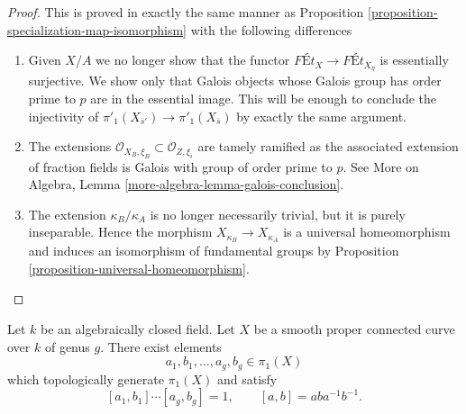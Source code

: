 \begin{proof}
This is proved in exactly the same manner as
Proposition \ref{proposition-specialization-map-isomorphism}
with the following differences
\begin{enumerate}
\item Given $X/A$ we no longer show that the functor
$\textit{F\'Et}_X \to \textit{F\'Et}_{X_{\overline{\eta}}}$
is essentially surjective. We show only that Galois objects
whose Galois group has order prime to $p$ are in the essential
image. This will be enough to conclude the injectivity of
$\pi'_1(X_{\overline{s}'}) \to \pi'_1(X_{\overline{s}})$ by
exactly the same argument.
\item The extensions
$\mathcal{O}_{X_B, \xi_B} \subset \mathcal{O}_{Z, \xi_i}$
are tamely ramified as the associated extension of fraction
fields is Galois with group of order prime to $p$. See
More on Algebra, Lemma \ref{more-algebra-lemma-galois-conclusion}.
\item The extension $\kappa_B/\kappa_A$ is no longer
necessarily trivial, but it is purely inseparable.
Hence the morphism $X_{\kappa_B} \to X_{\kappa_A}$
is a universal homeomorphism and induces an isomorphism
of fundamental groups by Proposition \ref{proposition-universal-homeomorphism}.
\end{enumerate}
\end{proof}


\begin{lemma}
\label{lemma-fundamental-group-smooth-proper-curve-generators}
\begin{reference}
\cite[Expos\'e 182, Corollaire 3, p. 217]{FGA}
\end{reference}
Let $k$ be an algebraically closed field. Let $X$ be a smooth proper
connected curve over $k$ of genus $g$. There exist elements
$$
a_1, b_1, \ldots, a_g, b_g \in \pi_1(X)
$$
which topologically generate $\pi_1(X)$ and satisfy
$$
[a_1, b_1] \cdots [a_g, b_g] = 1,
\qquad [a, b] = aba^{-1}b^{-1}.
$$
\end{lemma}

